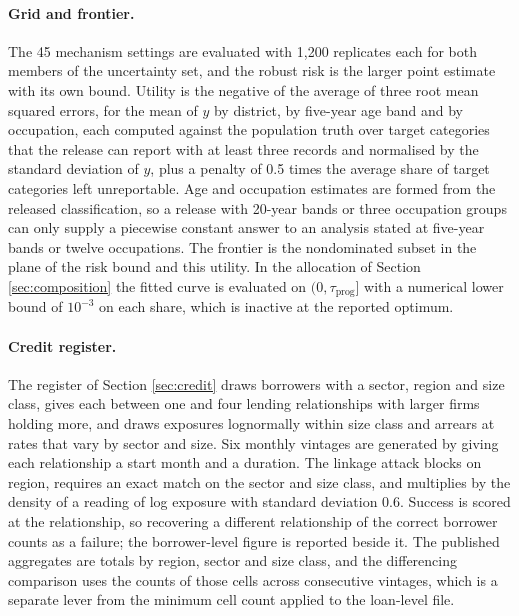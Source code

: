 \documentclass[11pt,a4paper]{article}
\theoremstyle{plain}
\theoremstyle{definition}
\begin{document}
\paragraph{Grid and frontier.} The 45 mechanism settings are evaluated with
1,200 replicates each for both members of the uncertainty set, and the robust
risk is the larger point estimate with its own bound. Utility is the negative of
the average of three root mean squared errors, for the mean of $y$ by district,
by five-year age band and by occupation, each computed against the population
truth over target categories that the release can report with at least three
records and normalised by the standard deviation of $y$, plus a penalty of 0.5
times the average share of target categories left unreportable. Age and
occupation estimates are formed from the released classification, so a release
with 20-year bands or three occupation groups can only supply a piecewise
constant answer to an analysis stated at five-year bands or twelve occupations.
The frontier is the nondominated subset in the plane of the risk bound and this
utility. In the allocation of Section \ref{sec:composition} the fitted curve is
evaluated on $(0, \tau_{\mathrm{prog}}]$ with a numerical lower bound of
$10^{-3}$ on each share, which is inactive at the reported optimum.

\paragraph{Credit register.} The register of Section \ref{sec:credit} draws
borrowers with a sector, region and size class, gives each between one and four
lending relationships with larger firms holding more, and draws exposures
lognormally within size class and arrears at rates that vary by sector and size.
Six monthly vintages are generated by giving each relationship a start month and a
duration. The linkage attack blocks on region, requires an exact match on the
sector and size class, and multiplies by the density of a reading of log exposure
with standard deviation 0.6. Success is scored at the relationship, so recovering a
different relationship of the correct borrower counts as a failure; the
borrower-level figure is reported beside it. The published aggregates are totals by
region, sector and size class, and the differencing comparison uses the counts of
those cells across consecutive vintages, which is a separate lever from the
minimum cell count applied to the loan-level file.
\end{document}

